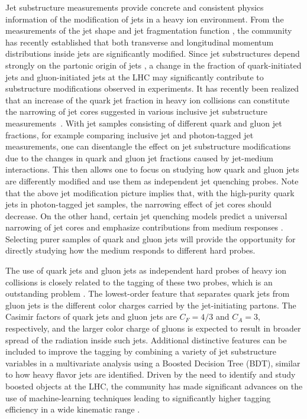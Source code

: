\documentclass[notoc]{JHEP3}
\begin{document}
Jet substructure measurements provide concrete and consistent physics information of the modification of jets in a heavy ion environment. From the measurements of the jet shape \cite{Ellis:1992qq,Chatrchyan:2013kwa,Khachatryan:2016tfj,Seymour:1997kj,Li:2011hy,Li:2012bw,Vitev:2008rz,Vitev:2009rd} and jet fragmentation function \cite{Procura:2009vm,Chatrchyan:2012gw,Aad:2014wha,Chatrchyan:2014ava,Aaboud:2017bzv,Sirunyan:2018qec}, the community has recently established that both transverse and longitudinal momentum distributions inside jets are significantly modified. Since jet substructures %
depend strongly on the partonic origin of jets \cite{Gallicchio:2011xq,Gallicchio:2012ez,Chien:2012ur,Chien:2015ctp,Chien:2014nsa}, a change in the fraction of quark-initiated jets and gluon-initiated jets at the LHC may significantly contribute to substructure modifications observed in experiments. It has recently been realized that an increase of the quark jet fraction in heavy ion collisions can constitute the narrowing of jet cores suggested in various inclusive jet substructure measurements~\cite{Chien:2015hda,Spousta:2015fca}. With jet samples consisting of different quark and gluon jet fractions, for example comparing inclusive jet and photon-tagged jet measurements, one can disentangle the effect on jet substructure modifications due to the changes in quark and gluon jet fractions caused by jet-medium interactions. This then allows one to focus on studying how quark and gluon jets are differently modified and use them as independent jet quenching probes. Note that the above jet modification picture implies that, with the high-purity quark jets in photon-tagged jet samples, the narrowing effect of jet cores should decrease. On the other hand, certain jet quenching models predict a universal narrowing of jet cores \cite{KunnawalkamElayavalli:2017hxo,Milhano:2017nzm,Casalderrey-Solana:2016jvj,Brewer:2017fqy} and emphasize contributions from medium responses \cite{Tachibana:2017syd}. Selecting purer samples of quark and gluon jets will provide the opportunity for directly studying how the medium responds to different hard probes.

The use of quark jets and gluon jets as independent hard probes of heavy ion collisions is closely related to the tagging of these two probes, which is an outstanding problem \cite{Gras:2017jty,Frye:2017yrw}. The lowest-order feature that separates quark jets from gluon jets is the different color charges carried by the jet-initiating partons. The Casimir factors of quark jets and gluon jets are $C_F = 4/3$ and $C_A=3$, respectively, and the larger color charge of gluons is expected to result in broader spread of the radiation inside such jets. Additional distinctive features can be included to improve the tagging by combining a variety of jet substructure variables in a multivariate analysis using a Boosted Decision Tree (BDT), similar to how heavy flavor jets are identified. Driven by the need to identify and study boosted objects at the LHC, the community has made significant advances on the use of machine-learning techniques leading to significantly higher tagging efficiency in a wide kinematic range \cite{Komiske:2016rsd, Larkoski:2017jix}.
\end{document}
